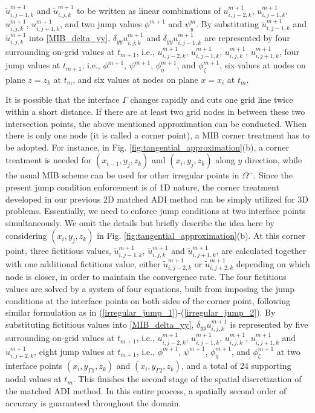 \documentclass[dissertation]{uathesis}
\begin{document}
\begin{body}
\begin{flushleft}
$\tilde{u}^{m+1}_{i,j-1,k}$ and $\tilde{u}^{m+1}_{i,j,k}$ 
to be written as linear combinations of $u^{m+1}_{i,j-2,k}$, $u^{m+1}_{i,j-1,k}$, $u^{m+1}_{i,j,k}$, $u^{m+1}_{i,j+1,k}$, and two jump values $\phi^{m+1}$ and $\psi_{y}^m$.
By  substituting $\tilde{u}^{m+1}_{i,j-1,k}$ and $\tilde{u}^{m+1}_{i,j,k}$  into \eqref{MIB_delta_yy}, $\delta_{yy} u^{m+1}_{i,j,k}$ and $\delta_{yy} u^{m+1}_{i,j-1,k}$ are represented by four surrounding on-grid values at $t_{m+1}$, i.e., $u^{m+1}_{i,j-2,k}$, $u^{m+1}_{i,j-1,k}$, $u^{m+1}_{i,j,k}$, $u^{m+1}_{i,j+1,k}$, four jump values at $t_{m+1}$, i.e., $\phi^{m+1}$, $\psi^{m+1}$, $\phi_{\eta}^{m+1}$, and  $\phi_{\zeta}^{m+1}$, 
six values at nodes on plane $z=z_{k}$ at $t_{m}$,
and six values at nodes on plane $x=x_{i}$ at $t_{m}$.

\hspace{1cm} It is possible that the interface $\Gamma$ changes rapidly and cuts one grid line twice within a short distance.
If there are at least two grid nodes in between these two intersection points, the above mentioned 
approximation can be conducted. 
When there is only one node (it is called a corner point), a MIB corner treatment has to be adopted. 
For instance, in Fig. \ref{fig:tangential_approximation}(b),
a corner treatment is needed for $(x_{i-1},y_j,z_k)$ and $(x_{i},y_j,z_k)$ along $y$ direction, 
while the usual MIB scheme can be used for other irregular points in $\Omega^-$. 
Since the present jump condition enforcement is of 1D nature, 
the corner treatment developed in our previous 2D matched ADI method \cite{zhao2015matched} can be simply utilized for 3D problems. 
Essentially, we need to enforce jump conditions at two interface points simultaneously. 
We omit the details but briefly describe the idea here by considering $(x_{i},y_j,z_k)$
in Fig. \ref{fig:tangential_approximation}(b). 
At this corner point, three fictitious values, $\tilde{u}^{m+1}_{i,j-1,k}$, $\tilde{u}^{m+1}_{i,j,k}$ and $\tilde{u}^{m+1}_{i,j+1,k}$, are calculated together with one additional fictitious value, either $\tilde{u}^{m+1}_{i,j-2,k}$ or $\tilde{u}^{m+1}_{i,j+2,k}$ depending on which node is closer, in order to maintain the convergence rate. The four fictitious values are solved by a system of four equations, built from imposing the jump conditions at the interface points on both sides of the corner point, following similar formulation as in (\ref{irregular_jump_1})-(\ref{irregular_jump_2}). 
By  substituting fictitious values into \eqref{MIB_delta_yy}, $\delta_{yy} u^{m+1}_{i,j,k}$ is  represented by five surrounding on-grid values at $t_{m+1}$, i.e., ${u}^{m+1}_{i,j-2,k}$, ${u}^{m+1}_{i,j-1,k}$, ${u}^{m+1}_{i,j,k}$, ${u}^{m+1}_{i,j+1,k}$ and ${u}^{m+1}_{i,j+2,k}$, 
eight jump values at $t_{m+1}$, i.e., $\phi^{m+1}$, $\psi^{m+1}$, $\phi_{\eta}^{m+1}$, and  $\phi_{\zeta}^{m+1}$ at two interface points $(x_i,y_{\Gamma1},z_k)$ and $(x_i,y_{\Gamma2},z_k)$, and a total of 24 supporting nodal values at $t_m$. 
This finishes the second stage of the spatial discretization of the matched ADI method. In this entire process, a spatially second order of accuracy is guaranteed throughout the domain. 


\end{flushleft}
\end{body}
\end{document}
